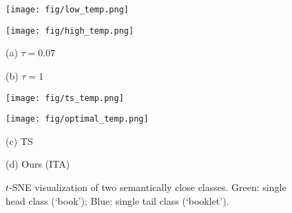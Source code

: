 \begin{figure}[!t] 
\begin{minipage}{0.49\linewidth}
\centerline{\texttt{[image: fig/low\_temp.png]}}
\end{minipage}
\begin{minipage}{0.49\linewidth}
\centerline{\texttt{[image: fig/high\_temp.png]}}
\end{minipage}

\begin{minipage}{0.49\linewidth}
\centerline{\footnotesize (a) $\tau=0.07$}
\end{minipage}
\begin{minipage}{0.49\linewidth}
\centerline{\footnotesize (b) $\tau=1$}
\end{minipage}

\begin{minipage}{0.49\linewidth}
\centerline{\texttt{[image: fig/ts\_temp.png]}}
\end{minipage}
\begin{minipage}{0.49\linewidth}
\centerline{\texttt{[image: fig/optimal\_temp.png]}}
\end{minipage}

\begin{minipage}{0.49\linewidth}
\centerline{\footnotesize (c) TS}
\end{minipage}
\begin{minipage}{0.49\linewidth}
\centerline{\footnotesize (d) Ours (ITA)}
\end{minipage}
\caption{$t$-SNE visualization of two semantically close classes. Green: single head class (`book'); Blue: single tail class (`booklet').}
\label{fig:ITA}
\end{figure}
